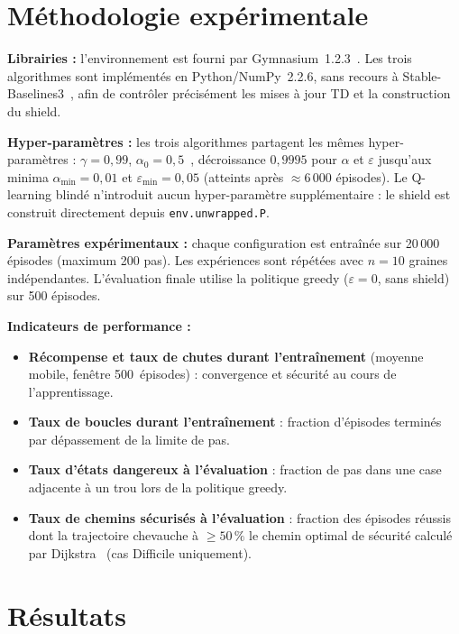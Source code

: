 \documentclass{article}
\begin{document}
\section{Méthodologie expérimentale}

\textbf{Librairies :} l'environnement est fourni par Gymnasium~1.2.3~\citep{towers2024}. Les trois algorithmes sont implémentés en Python/NumPy~2.2.6, sans recours à Stable-Baselines3~\citep{raffin2021}, afin de contrôler précisément les mises à jour TD et la construction du shield.

\textbf{Hyper-paramètres :} les trois algorithmes partagent les mêmes hyper-paramètres : $\gamma = 0{,}99$, $\alpha_0 = 0{,}5$~\citep{sutton2018}, décroissance $0{,}9995$ pour $\alpha$ et $\varepsilon$ jusqu'aux minima $\alpha_{\min}=0{,}01$ et $\varepsilon_{\min}=0{,}05$ (atteints après $\approx\!6\,000$ épisodes). Le Q-learning blindé n'introduit aucun hyper-paramètre supplémentaire : le shield est construit directement depuis \texttt{env.unwrapped.P}.

\textbf{Paramètres expérimentaux :} chaque configuration est entraînée sur 20\,000 épisodes (maximum 200 pas). Les expériences sont répétées avec $n=10$ graines indépendantes. L'évaluation finale utilise la politique greedy ($\varepsilon=0$, sans shield) sur 500 épisodes.

\textbf{Indicateurs de performance :}
\begin{itemize}
  \item \textbf{Récompense et taux de chutes durant l'entraînement} (moyenne mobile, fenêtre 500~épisodes) : convergence et sécurité au cours de l'apprentissage.
  \item \textbf{Taux de boucles durant l'entraînement} : fraction d'épisodes terminés par dépassement de la limite de pas.
  \item \textbf{Taux d'états dangereux à l'évaluation} : fraction de pas dans une case adjacente à un trou lors de la politique greedy.
  \item \textbf{Taux de chemins sécurisés à l'évaluation} : fraction des épisodes réussis dont la trajectoire chevauche à $\geq 50\,\%$ le chemin optimal de sécurité calculé par Dijkstra~\citep{dijkstra1959} (cas Difficile uniquement).
\end{itemize}

\section{Résultats}
\end{document}
